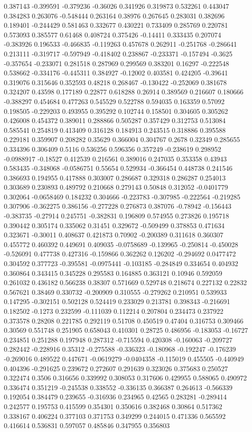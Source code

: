 0.387143 -0.399591 -0.379236 -0.36026 0.341926 0.319873 0.532261 0.443047 0.384283 0.263076 -0.548444 0.263164 0.38976 0.267645 0.283031 0.382696 0.189401 -0.244429 0.581463 0.332677 0.430221 0.733409 0.285769 0.220781 0.573093 0.385577 0.61468 0.408724 0.375426 -0.14411 0.333435 0.207074 -0.383926 0.196533 -0.466835 -0.119263 0.457678 0.262911 -0.251768 -0.286641 0.213111 -0.319717 -0.597949 -0.418402 0.238867 -0.233371 -0.157494 -0.3625 -0.357654 -0.233071 0.281518 0.287969 0.299569 0.383201 0.16297 -0.222548 0.538662 -0.334176 -0.445311 0.384927 -0.12002 0.403581 0.424205 -0.39641 0.319076 0.315646 0.352593 0.48218 0.268467 -0.130422 -0.252069 0.381678 0.324207 0.43598 0.177189 0.22877 0.618288 0.26914 0.389569 0.216607 0.180666 -0.388297 0.454684 0.477263 0.545529 0.522788 0.594035 0.163359 0.57092 0.198505 -0.229203 0.493955 0.395292 0.102744 0.158501 0.304605 0.305262 0.426008 0.454372 0.389011 0.288866 0.505287 0.357429 0.312753 0.513084 0.585541 0.254819 0.413409 0.316128 0.184913 0.243515 0.318886 0.395588 0.229181 0.359907 0.208282 0.35629 0.366004 0.304767 0.2678 0.32349 0.285655 0.334396 0.306409 0.5116 0.536256 0.596356 0.357249 -0.238619 0.298952 -0.0988917 -0.18527 0.412539 0.216561 0.389016 0.247035 0.353358 0.43943 0.583435 -0.348068 -0.0586751 0.55654 0.529934 -0.366454 0.448738 0.241546 0.386693 0.194955 0.417888 0.303007 0.286687 0.329318 0.286287 0.254013 0.303689 0.230893 0.489792 0.210668 0.279143 0.50848 0.312052 -0.0401779 0.302064 -0.0658469 0.184232 0.304666 -0.223783 -0.307985 -0.222564 -0.219285 0.307906 -0.362275 0.386156 -0.277228 0.276873 0.387076 -0.78942 -0.156443 -0.383735 -0.27914 0.245751 -0.382831 0.196809 0.574955 0.273826 0.195718 0.390442 0.305174 0.335062 0.31451 0.329672 -0.509499 0.378853 0.471634 0.323671 -0.30011 0.408637 0.421873 0.70902 -0.200389 0.311618 0.360307 0.455772 0.460392 0.449691 0.409035 -0.0758689 -0.139965 -0.250814 -0.450028 -0.526091 0.477738 0.427316 -0.159866 0.362262 0.126202 -0.294692 0.0477472 0.304592 0.377723 -0.395581 -0.0975441 -0.103185 -0.284849 0.334654 0.404932 0.360864 0.343415 0.345228 0.295583 0.164885 0.363121 0.10946 0.592059 0.261032 0.436182 0.566238 0.38307 0.571669 0.529748 0.218674 0.227132 0.22832 0.567621 0.38469 0.330732 -0.200909 0.310555 -0.279262 0.210951 0.539933 0.147295 -0.302151 0.502128 0.524419 0.233029 0.213781 0.398343 -0.216691 0.182502 -0.1273 0.232599 -0.111039 0.112214 0.207804 0.234473 0.237922 0.373578 0.28208 0.221785 0.292119 0.51708 0.450519 0.47404 0.316753 0.309466 0.30569 0.551748 0.251905 0.658043 0.410301 0.28725 0.486956 -0.183053 -0.16727 0.234851 0.251288 0.197948 0.287312 -0.715594 0.420308 -0.160063 -0.209727 0.282442 -0.228916 0.35312 -0.275588 -0.336323 -0.180968 -0.192247 -0.176239 -0.269016 0.489522 0.447671 -0.0619279 -0.0404358 -0.115019 0.455505 -0.440949 0.404396 -0.291625 0.239672 0.272607 0.291639 0.323026 0.375683 0.250527 0.322474 0.3506 0.316656 0.339992 0.308053 0.317606 0.429955 0.588065 0.490972 0.336474 0.351219 -0.245538 0.338552 -0.336135 0.366387 0.264613 -0.566339 0.192054 0.384479 0.239655 -0.316936 0.234965 0.42565 0.283281 -0.289414 0.242577 0.195753 0.415599 0.354301 0.350616 0.382468 0.30864 0.517362 0.338167 0.406224 0.377103 0.371753 0.349299 0.244015 0.471336 0.565592 0.416614 0.536831 0.597057 0.485846 0.347955 0.356803 